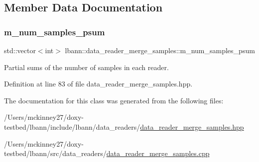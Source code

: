 \subsection{Member Data Documentation}
\mbox{\label{classlbann_1_1data__reader__merge__samples_afd297d61c11bb6b0d03ce64836bd1300}} 
\subsubsection{\texorpdfstring{m\+\_\+num\+\_\+samples\+\_\+psum}{m\_num\_samples\_psum}}
{\footnotesize\ttfamily std\+::vector$<$int$>$ lbann\+::data\+\_\+reader\+\_\+merge\+\_\+samples\+::m\+\_\+num\+\_\+samples\+\_\+psum\hspace{0.3cm}{\ttfamily [protected]}}



Partial sums of the number of samples in each reader. 



Definition at line 83 of file data\+\_\+reader\+\_\+merge\+\_\+samples.\+hpp.



The documentation for this class was generated from the following files\+:\begin{DoxyCompactItemize}
\item 
/\+Users/mckinney27/doxy-\/testbed/lbann/include/lbann/data\+\_\+readers/\hyperlink{data__reader__merge__samples_8hpp}{data\+\_\+reader\+\_\+merge\+\_\+samples.\+hpp}\item 
/\+Users/mckinney27/doxy-\/testbed/lbann/src/data\+\_\+readers/\hyperlink{data__reader__merge__samples_8cpp}{data\+\_\+reader\+\_\+merge\+\_\+samples.\+cpp}\end{DoxyCompactItemize}
